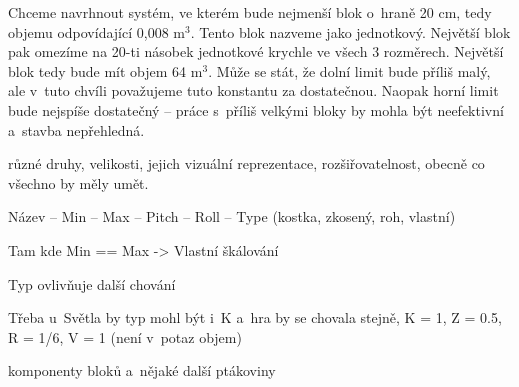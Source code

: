 Chceme navrhnout systém, ve kterém bude nejmenší blok o~hraně 20 cm, tedy objemu odpovídající 0,008 m$^3$. Tento blok nazveme jako jednotkový. Největší blok pak omezíme na 20-ti násobek jednotkové krychle ve všech 3 rozměrech. Největší blok tedy bude mít objem 64 m$^3$. Může se stát, že dolní limit bude příliš malý, ale v~tuto chvíli považujeme tuto konstantu za dostatečnou. Naopak horní limit bude nejspíše dostatečný -- práce s~příliš velkými bloky by mohla být neefektivní a~stavba nepřehledná.


různé druhy, velikosti, jejich vizuální reprezentace, rozšiřovatelnost, obecně co všechno by měly umět.

Název -- Min -- Max -- Pitch -- Roll -- Type (kostka, zkosený, roh, vlastní)

Tam kde Min == Max -> Vlastní škálování

Typ ovlivňuje další chování

Třeba u~Světla by typ mohl být i~K a~hra by se chovala stejně, K = 1, Z = 0.5, R = 1/6, V = 1 (není v~potaz objem)

komponenty bloků a~nějaké další ptákoviny

